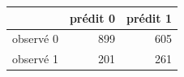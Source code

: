 \begin{tabular}{lrr}
\toprule
\textbf{} & \textbf{prédit 0} & \textbf{prédit 1} \\
\midrule
observé 0 & 899 & 605 \\
observé 1 & 201 & 261 \\
\bottomrule
\end{tabular}
